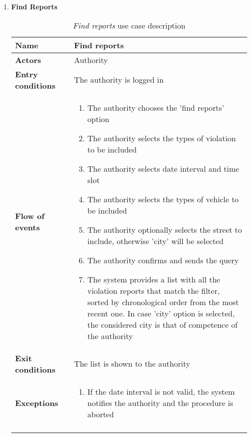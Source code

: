 \begin{enumerate}
			\item \textbf{Find Reports}
				\begin{longtable}{p{0.25\linewidth}p{0.75\linewidth}}
					\toprule
					\textbf{Name} & \textbf{Find reports} \\
					\midrule
					\textbf{Actors} & Authority\\
					\midrule
					\textbf{Entry conditions} & The authority is logged in \\
					\midrule
					\textbf{Flow of events} & 
					\begin{enumerate}
						\item The authority chooses the 'find reports' option
						\item The authority selects the types of violation to be included
						\item The authority selects date interval and time slot
						\item The authority selects the types of vehicle to be included
						\item The authority optionally selects the street to include, otherwise 'city' will be selected
						\item The authority confirms and sends the query
						\item The system provides a list with all the violation reports that match the filter, sorted by chronological order from the most recent one. In case 'city' option is selected, the considered city is that of competence of the authority
					\end{enumerate} \\
					\midrule
					\textbf{Exit conditions} & The list is shown to the authority\\
					\midrule
					\textbf{Exceptions} &  
					\begin{enumerate}
						\item If the date interval is not valid, the system notifies the authority and the procedure is aborted
					\end{enumerate}\\
					\bottomrule
					\caption{\emph{Find reports} use case description}
				\end{longtable}
		\end{enumerate}

	\FloatBarrier
	\newpage

